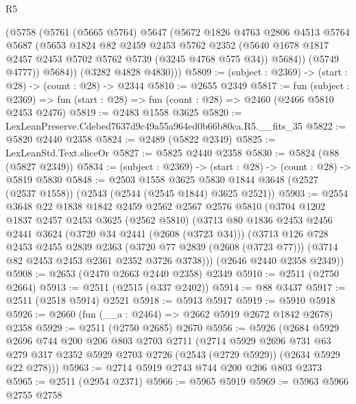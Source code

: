 \begin{lexlean}{R5}
\begin{coremodule}
          (@5758
            (@5761
              (@5665 @5764)
              @5647
              (@5672
                @1826
                @4763
                @2806
                @4513
                @5764
                @5687
                (@5653
                  @1824
                  @82
                  @2459
                  @2453
                  @5762
                  @2352
                  (@5640 @1678 @1817 @2457 @2453 @5702 @5762 @5739 (@3245 @4768 @575 @34))
                  @5684))
              (@5749 @4777))
            @5684))
        (@3282 @4828 @4830)))
@5809 := (subject : @2369) -> (start : @28) -> (count : @28) -> @2344
@5810 := @2655 @2349
@5817 := fun (subject : @2369) =>
  fun (start : @28) => fun (count : @28) => @2460 (@2466 @5810 @2453 @2476)
@5819 := @2483 @1558 @3625
@5820 := LexLeanPreserve.Cdebed7637d9c49a55a964ed0b66b80ca.R5.__fits_35
@5822 := @5820 @2440 @2358
@5824 := @2489 (@5822 @2349)
@5825 := LexLeanStd.Text.sliceOr
@5827 := @5825 @2440 @2358
@5830 := @5824 (@88 (@5827 @2349))
@5834 := (subject : @2369) -> (start : @28) -> (count : @28) -> @5819 @5830
@5848 := @2503
    @1558
    @3625
    @5830
    @1844
    @3648
    (@2527 (@2537 @1558))
    (@2543 (@2544 (@2545 @1844) @3625 @2521))
@5903 := @2554
    @3648
    @22
    @1838
    @1842
    @2459
    @2562
    @2567
    @2576
    @5810
    (@3704
      @1202
      @1837
      @2457
      @2453
      @3625
      (@2562 @5810)
      (@3713
        @80
        @1836
        @2453
        @2456
        @2441
        @3624
        (@3720 @34 @2441 (@2608 (@3723 @34)))
        (@3713
          @126
          @728
          @2453
          @2455
          @2839
          @2363
          (@3720 @77 @2839 (@2608 (@3723 @77)))
          (@3714 @82 @2453 @2453 @2361 @2352 @3726 @3738)))
      (@2646 @2440 @2358 @2349))
@5908 := @2653 (@2470 @2663 @2440 @2358) @2349
@5910 := @2511 (@2750 @2664)
@5913 := @2511 (@2515 (@337 @2402))
@5914 := @88 @3437
@5917 := @2511 (@2518 @5914) @2521
@5918 := @5913 @5917
@5919 := @5910 @5918
@5926 := @2660 (fun (__a : @2464) => @2662 @5919 @2672 @1842 @2678) @2358
@5929 := @2511 (@2750 @2685) @2670
@5956 := @5926
    (@2684
      @5929
      @2696
      @744
      @200
      @206
      @803
      @2703
      @2711
      (@2714
        @5929
        @2696
        @731
        @63
        @279
        @317
        @2352
        @5929
        @2703
        @2726
        (@2543 (@2729 @5929))
        (@2634 @5929 @22 @278)))
@5963 := @2714 @5919 @2743 @744 @200 @206 @803 @2373
@5965 := @2511 (@2954 @2371)
@5966 := @5965 @5919
@5969 := @5963 @5966 @2755 @2758

\end{coremodule}
\end{lexlean}
